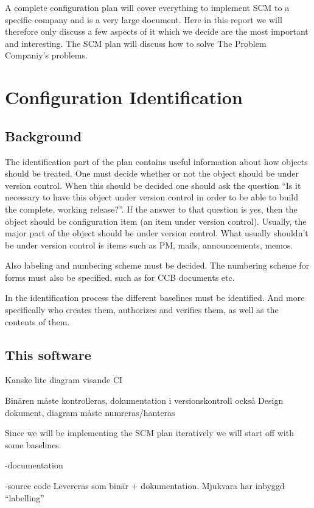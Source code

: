 \documentclass[a4paper,10pt]{article}
\begin{document}
A complete configuration plan will cover everything to implement SCM to a specific company and is a very large document. Here in this report we will therefore only discuss a few aspects of it which we decide are the most important and interesting. The SCM plan will discuss how to solve The Problem Companiy's problems.



\section{Configuration Identification}

\subsection{Background}
The identification part of the plan contains useful information about how objects should be treated. One must decide whether or not the object should be under version control. When this should be decided one should ask the question ``Is it necessary to have this object under version control in order to be able to build the complete, working release?''. If the answer to that question is yes, then the object should be configuration item (an item under version control).
Usually, the major part of the object should be under version control. What usually shouldn't be under version control is items such as PM, mails, announcements, memos.

Also labeling and numbering scheme must be decided. The numbering scheme for forms must also be specified, such as for CCB documents etc.

In the identification process the different baselines must be identified. And more specifically who creates them, authorizes and verifies them, as well as the contents of them.\cite{cagan}

\subsection{This software}


Kanske lite diagram visande CI

Binären måste kontrolleras, dokumentation i versionskontroll också
Design dokument, diagram måste numreras/hanteras

Since we will be implementing the SCM plan iteratively we will start off with some baselines.

-documentation

-source code
Levereras som binär + dokumentation.
Mjukvara har inbyggd ``labelling''
\end{document}

